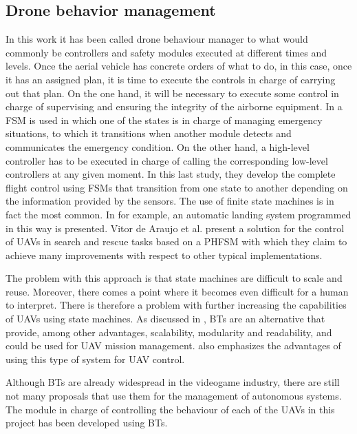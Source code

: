 \subsection{Drone behavior management}
\label{subsec:DroneBehaviorManagement}
In this work it has been called drone behaviour manager to what would commonly be controllers and safety modules executed at different times and levels. Once the aerial vehicle has concrete orders of what to do, in this case, once it has an assigned plan, it is time to execute the controls in charge of carrying out that plan. On the one hand, it will be necessary to execute some control in charge of supervising and ensuring the integrity of the airborne equipment. In \cite{monterrosa2016design} a \gls{FSM} is used in which one of the states is in charge of managing emergency situations, to which it transitions when another module detects and communicates the emergency condition. On the other hand, a high-level controller has to be executed in charge of calling the corresponding low-level controllers at any given moment. In this last study, they develop the complete flight control using \glspl{FSM} that transition from one state to another depending on the information provided by the sensors. The use of finite state machines is in fact the most common. In \cite{kugler2017autoland} for example, an automatic landing system programmed in this way is presented. Vitor de Araujo et al. \cite{de2014parallel} present a solution for the control of UAVs in search and rescue tasks based on a \gls{PHFSM} with which they claim to achieve many improvements with respect to other typical implementations.

The problem with this approach is that state machines are difficult to scale and reuse. Moreover, there comes a point where it becomes even difficult for a human to interpret. There is therefore a problem with further increasing the capabilities of \glspl{UAV} using state machines. As discussed in \cite{klockner2013behavior}, \glspl{BT} are an alternative that provide, among other advantages, scalability, modularity and readability, and could be used for \gls{UAV} mission management. \cite{ogren2012increasing} also emphasizes the advantages of using this type of system for \gls{UAV} control.

Although \glspl{BT} are already widespread in the videogame industry, there are still not many proposals that use them for the management of autonomous systems. The module in charge of controlling the behaviour of each of the \glspl{UAV} in this project has been developed using \glspl{BT}.

